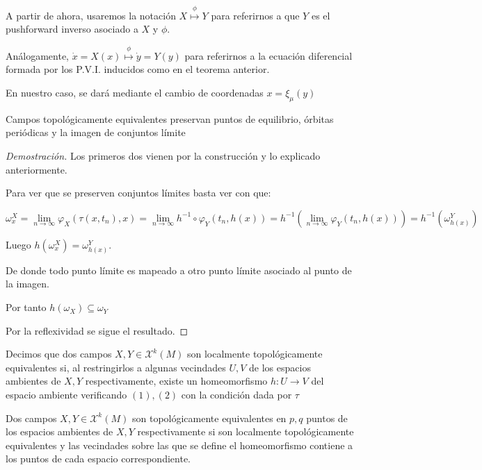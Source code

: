 \begin{notn}
	A partir de ahora, usaremos la notación $X\overset{\phi}{\mapsto} Y$ para referirnos a que $Y$ es el pushforward inverso asociado a $X$ y $\phi$.
	
	Análogamente, $\dot{x} = X(x) \overset{\phi}{\mapsto}\dot{y} = Y(y)$ para referirnos a la ecuación diferencial formada por los P.V.I. inducidos como en el teorema anterior.
	
	En nuestro caso, se dará mediante el cambio de coordenadas $x = \xi_\mu(y)$
\end{notn}

\begin{prop}
	Campos topológicamente equivalentes preservan puntos de equilibrio, órbitas periódicas y la imagen de conjuntos límite 
\end{prop}

\begin{proof}[Demostración]
	Los primeros dos vienen por la construcción y lo explicado anteriormente.
	
	Para ver que se preserven conjuntos límites basta ver con que:
	
	\begin{equation*}
		\omega^X_{x}= \lim_{n \to \infty}\varphi_{X}(\tau(x,t_n),x) = \lim_{n \to \infty} h^{-1}\circ \varphi_Y(t_n , h(x))	=  h^{-1} (  \lim_{n \to \infty} \varphi_Y(t_n , h(x)) ) = h^{-1} (\omega^Y_{h(x)} )
	\end{equation*}
	
	Luego $h(\omega^X_{x}) = \omega^Y_{h(x)}$.
	
	De donde todo punto límite es mapeado a otro punto límite asociado al punto de la imagen.
	
	Por tanto $h(\omega_X) \subseteq \omega_Y$
	
	Por la reflexividad se sigue el resultado.
\end{proof}

\begin{defn}
	Decimos que dos campos $X,Y \in \mathcal{X}^k(M)$ son  localmente topológicamente equivalentes si, al restringirlos a algunas vecindades $U,V$ de los espacios ambientes de $X,Y$ respectivamente, existe un homeomorfismo $h: U \to V$ del espacio ambiente verificando $(1), (2)$ con la condición dada por $\tau$
\end{defn}

\begin{defn}
	Dos campos $X,Y \in \mathcal{X}^k(M)$ son topológicamente equivalentes en $p,q$ puntos de los espacios ambientes de $X,Y$ respectivamente si son localmente topológicamente equivalentes y las vecindades sobre las que se define el homeomorfismo contiene a los puntos de cada espacio correspondiente.
\end{defn}

